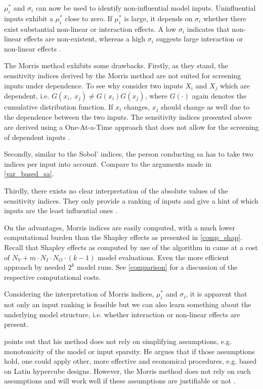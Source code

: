 $\mu_i^\ast$ and $\sigma_i$ can now be used to identify non-influential model inputs. Uninfluential inputs exhibit a $\mu_i^\ast$ close to zero. If $\mu_i^\ast$ is large, it depends on $\sigma_i$ whether there exist substantial non-linear or interaction effects. A low $\sigma_i$ indicates that non-linear effects are non-existent, whereas a high $\sigma_i$ suggests large interaction or non-linear effects \citep{GM17}.

The Morris method exhibits some drawbacks. Firstly, as they stand, the sensitivity indices derived by the Morris method are not suited for screening inputs under dependence. To see why consider two inputs $X_i$ and $X_j$ which are dependent, i.e. $G(x_i,\ x_j) \neq G(x_i)G(x_j)$, where $G(\cdot)$ again denotes the cumulative distribution function. If $x_i$ changes, $x_j$ should change as well due to the dependence between the two inputs. The sensitivity indices presented above are derived using a One-At-a-Time approach that does not allow for the screening of dependent inputs \citep{GM17}.

Secondly, similar to the Sobol' indices, the person conducting sa has to take two indices per input into account. Compare to the arguments made in \cref{var_based_sa}.

Thirdly, there exists no clear interpretation of the absolute values of the sensitivity indices. They only provide a ranking of inputs and give a hint of which inputs are the least influential ones \citep{GM17}.

On the advantages, Morris indices are easily computed, with a much lower computational burden than the Shapley effects as presented in \cref{comp_shap}. Recall that Shapley effects as computed by use of the algorithm in \citet{SNS16} came at a cost of $N_V+m \cdot N_I \cdot N_O \cdot (k-1)$ model evaluations. Even the more efficient approach by \citet{PRB20} needed $2^k$ model runs. See \cref{comparison} for a discussion of the respective computational costs.

Considering the interpretation of Morris indices, $\mu_i^\ast$ and $\sigma_i$, it is apparent that not only an input ranking is feasible but we can also learn something about the underlying model structure, i.e. whether interaction or non-linear effects are present.

\citet{M91} points out that his method does not rely on simplifying assumptions, e.g. monotonicity of the model or input sparsity. He argues that if those assumptions hold, one could apply other, more effective and economical procedures, e.g. based on Latin hypercube designs. However, the Morris method does not rely on such assumptions and will work well if these assumptions are justifiable or not \citep{M91}.

